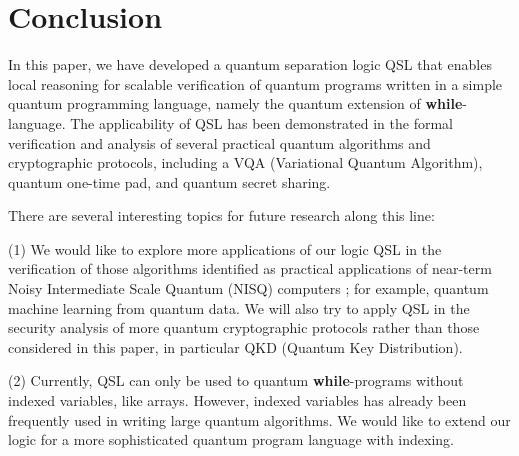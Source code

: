 \documentclass[conference,compsoc, 10pt]{IEEEtran}
\newcommand {\sepimp} {\mathrel{-\mkern-6mu*}}
\newcommand{\sd}{\diamond}%
\newcommand {\sdimp} {\mathrel{-\mkern-2.5mu\diamond}}
\begin{document}
	
	\section{Conclusion}
	\label{sec conclusion}
	In this paper, we have developed a quantum separation logic QSL that enables local reasoning for scalable verification of quantum programs written in a simple quantum programming language, namely the quantum extension of \textbf{while}-language.	The applicability of QSL has been demonstrated in 
	the formal verification and analysis of several practical quantum algorithms and cryptographic protocols, including a VQA (Variational Quantum Algorithm), quantum one-time pad, and quantum secret sharing.
	
	There are several interesting topics for future research along this line:
	
	(1) We would like to explore more applications of our logic QSL in the verification of those algorithms identified as practical applications of near-term Noisy Intermediate Scale Quantum (NISQ) computers \cite{Pre18}; for example, quantum machine learning from quantum data. We will also try to apply QSL in the security analysis of more quantum cryptographic protocols rather than those considered in this paper, in particular QKD (Quantum Key Distribution).  
	
	(2) Currently, QSL can only be used to quantum \textbf{while}-programs
    without indexed variables, like arrays. However, indexed variables has
    already been frequently used in writing large quantum algorithms. We would
    like to extend our logic for a more sophisticated quantum program language
    with indexing.
	
\end{document}
